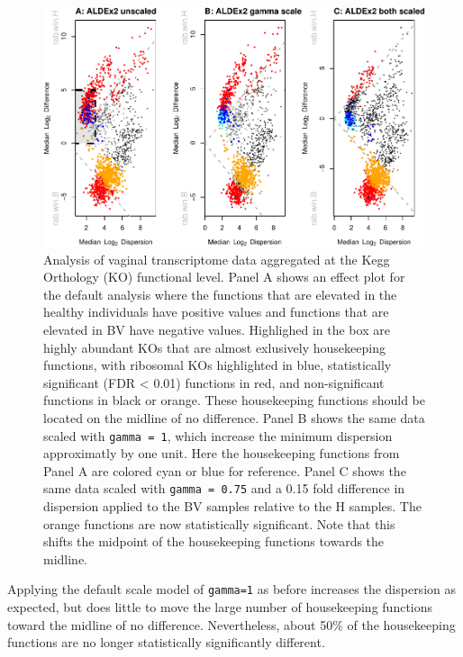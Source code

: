 \documentclass[
]{article}
\begin{document}
\begin{figure}
\centering
\includegraphics{go3_files/figure-latex/meta-1.pdf}
\caption{Analysis of vaginal transcriptome data aggregated at the Kegg
Orthology (KO) functional level. Panel A shows an effect plot for the
default analysis where the functions that are elevated in the healthy
individuals have positive values and functions that are elevated in BV
have negative values. Highlighed in the box are highly abundant KOs that
are almost exlusively housekeeping functions, with ribosomal KOs
highlighted in blue, statistically significant (FDR \textless{} 0.01)
functions in red, and non-significant functions in black or orange.
These housekeeping functions should be located on the midline of no
difference. Panel B shows the same data scaled with
\texttt{gamma\ =\ 1}, which increase the minimum dispersion approximatly
by one unit. Here the housekeeping functions from Panel A are colored
cyan or blue for reference. Panel C shows the same data scaled with
\texttt{gamma\ =\ 0.75} and a 0.15 fold difference in dispersion applied
to the BV samples relative to the H samples. The orange functions are
now statistically significant. Note that this shifts the midpoint of the
housekeeping functions towards the midline.}
\end{figure}

Applying the default scale model of \texttt{gamma=1} as before increases
the dispersion as expected, but does little to move the large number of
housekeeping functions toward the midline of no difference.
Nevertheless, about 50\% of the housekeeping functions are no longer
statistically significantly different.
\end{document}
